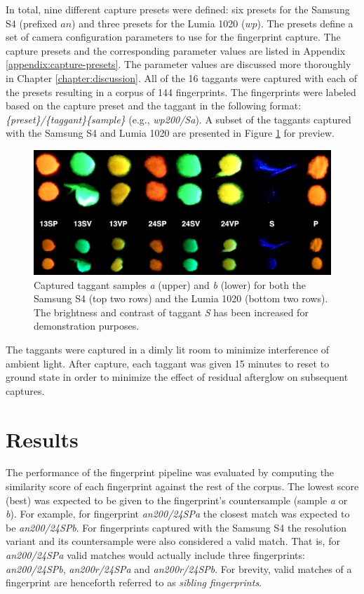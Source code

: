 \documentclass[thesis.tex]{subfiles}
\begin{document}
In total, nine different capture presets were defined: six presets for the Samsung S4 (prefixed $an$) and three presets for the Lumia 1020 ($wp$). The presets define a set of camera configuration parameters to use for the fingerprint capture. The capture presets and the corresponding parameter values are listed in Appendix \ref{appendix:capture-presets}. The parameter values are discussed more thoroughly in Chapter \ref{chapter:discussion}. All of the 16 taggants were captured with each of the presets resulting in a corpus of 144 fingerprints. The fingerprints were labeled based on the capture preset and the taggant in the following format: \emph{\{preset\}/\{taggant\}\{sample\}} (e.g., \emph{wp200/Sa}). A subset of the taggants captured with the Samsung S4 and Lumia 1020 are presented in Figure \ref{figure:taggants} for preview.


\begin{figure}[h]
\label{figure:taggants}
\centering \includegraphics[width=\textwidth,height=\textheight,keepaspectratio=true]{images/experiment/taggants}
\caption{Captured taggant samples \emph{a} (upper) and \emph{b} (lower) for both the Samsung S4 (top two rows) and the Lumia 1020 (bottom two rows). The brightness and contrast of taggant \emph{S} has been increased for demonstration purposes.}
\end{figure}
\clearpage

The taggants were captured in a dimly lit room to minimize interference of ambient light. After capture, each taggant was given 15 minutes to reset to ground state in order to minimize the effect of residual afterglow on subsequent captures.

\section{Results}
\label{chapter:results}

The performance of the fingerprint pipeline was evaluated by computing the similarity score of each fingerprint against the rest of the corpus. The lowest score (best) was expected to be given to the fingerprint's countersample (sample \emph{a} or \emph{b}). For example, for fingerprint \emph{an200/24SPa} the closest match was expected to be \emph{an200/24SPb}. For fingerprints captured with the Samsung S4 the resolution variant and its countersample were also considered a valid match. That is, for \emph{an200/24SPa} valid matches would actually include three fingerprints: \emph{an200/24SPb}, \emph{an200r/24SPa} and \emph{an200r/24SPb}. For brevity, valid matches of a fingerprint are henceforth referred to as \emph{sibling fingerprints}.
\end{document}
